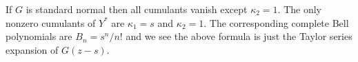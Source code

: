 \documentclass[11pt]{article}
\theoremstyle{definition}
\begin{document}
If \(G\) is standard normal then all cumulants vanish except \(\kappa_2 = 1\).
The only nonzero cumulants of \(Y^*\) are \(\kappa_1 = s\)
and \(\kappa_2 = 1\). The corresponding complete Bell polynomials
are \(B_n = s^n/n!\) and we see the above formula is just
the Taylor series expansion of \(G(z - s)\).
%
%

%
%
\end{document}
